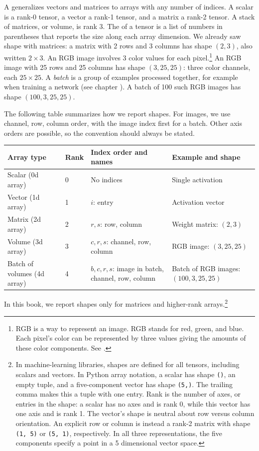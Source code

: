 A  generalizes vectors and matrices to arrays with any number of indices. A scalar is a rank-0 tensor, a vector a rank-1 tensor, and a matrix a rank-2 tensor. A stack of matrices, or volume, is rank 3. The  of a tensor is a list of numbers in parentheses that reports the size along each array dimension. We already saw shape with matrices: a matrix with 2 rows and 3 columns has shape $(2,3)$, also written $2\times3$. An RGB image involves 3 color values for each pixel.\footnote{RGB is a way to represent an image. RGB stands for red, green, and blue. Each pixel's color can be represented by three values giving the amounts of these color components. See .} An RGB image with 25 rows and 25 columns has shape $(3,25,25)$: three color channels, each $25\times25$. A \emph{batch} is a group of examples processed together, for example when training a network (see chapter ). A batch of 100 such RGB images has shape $(100,3,25,25)$.

The following table summarizes how we report shapes. For images, we use channel, row, column order, with the image index first for a batch. Other axis orders are possible, so the convention should always be stated.

\begin{center}
\begingroup
\small
\renewcommand{\arraystretch}{1.25}
\begin{tabular}{@{}p{.16\linewidth}p{.08\linewidth}p{.30\linewidth}p{.34\linewidth}@{}}
\hline
Array type & Rank & Index order and names & Example and shape \\
\hline
Scalar (0d array) & 0 & No indices & Single activation \\
Vector (1d array) & 1 & $i$: entry & Activation vector \\
Matrix (2d array) & 2 & $r,s$: row, column & Weight matrix: $(2,3)$ \\
Volume (3d array) & 3 & $c,r,s$: channel, row, column & RGB image: $(3,25,25)$ \\
Batch of volumes (4d array) & 4 & $b,c,r,s$: image in batch, channel, row, column & Batch of RGB images: $(100,3,25,25)$ \\
\hline
\end{tabular}
\endgroup
\end{center}

In this book, we report shapes only for matrices and higher-rank arrays.\footnote{In machine-learning libraries, shapes are defined for all tensors, including scalars and vectors. In Python array notation, a scalar has shape \texttt{()}, an empty tuple, and a five-component vector has shape \texttt{(5,)}. The trailing comma makes this a tuple with one entry. Rank is the number of axes, or entries in the shape: a scalar has no axes and is rank 0, while this vector has one axis and is rank 1. The vector's shape is neutral about row versus column orientation. An explicit row or column is instead a rank-2 matrix with shape \texttt{(1, 5)} or \texttt{(5, 1)}, respectively. In all three representations, the five components specify a point in a 5 dimensional vector space.}

